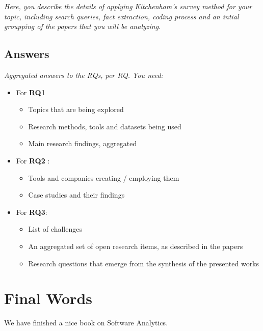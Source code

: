\documentclass[]{book}
\providecommand{\tightlist}{%
  \setlength{\itemsep}{0pt}\setlength{\parskip}{0pt}}
\begin{document}
\emph{Here, you describe the details of applying Kitchenham's survey
method for your topic, including search queries, fact extraction, coding
process and an intial groupping of the papers that you will be
analyzing.}

\section{Answers}\label{answers}

\emph{Aggregated answers to the RQs, per RQ. You need:}

\begin{itemize}
\tightlist
\item
  For \textbf{RQ1}

  \begin{itemize}
  \tightlist
  \item
    Topics that are being explored
  \item
    Research methods, tools and datasets being used
  \item
    Main research findings, aggregated
  \end{itemize}
\item
  For \textbf{RQ2} :

  \begin{itemize}
  \tightlist
  \item
    Tools and companies creating / employing them
  \item
    Case studies and their findings
  \end{itemize}
\item
  For \textbf{RQ3}:

  \begin{itemize}
  \tightlist
  \item
    List of challenges
  \item
    An aggregated set of open research items, as described in the papers
  \item
    Research questions that emerge from the synthesis of the presented
    works
  \end{itemize}
\end{itemize}

\chapter{Final Words}\label{final-words}

We have finished a nice book on Software Analytics.


\end{document}
